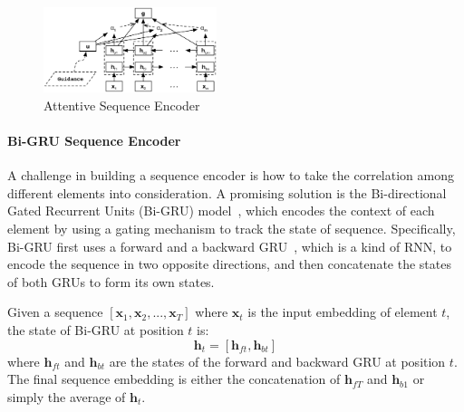 \begin{figure}[htbp]
\vspace{-1em}
\begin{center}
\includegraphics[width=0.45\textwidth]{figures/attentive_seq_encoder.png}	
\caption{Attentive Sequence Encoder}
\label{fig_seq_encoder}
\end{center}
\vspace{-1.5em}
\end{figure}


\paragraph{Bi-GRU Sequence Encoder} 
A challenge in building a sequence encoder is how to take the correlation among different elements into consideration. A promising solution is the Bi-directional Gated Recurrent Units (Bi-GRU) model~\cite{bahdanau2015neural}, which encodes the context of each element by using a gating mechanism to track the state of sequence.
Specifically, Bi-GRU first uses a forward and a backward GRU~\cite{cho2014learning}, which is a kind of RNN, to encode the sequence in two opposite directions, and then concatenate the states of both GRUs to form its own states. 

Given a sequence $[\mathbf{x}_1, \mathbf{x}_2, ..., \mathbf{x}_T]$ where $\mathbf{x}_t$ is the input embedding of element $t$, the state of Bi-GRU at position $t$ is:
%
\begin{equation}
\mathbf{h}_t = [\mathbf{h}_{ft}, \mathbf{h}_{bt}]
\end{equation}
where $\mathbf{h}_{ft}$ and $\mathbf{h}_{bt}$ are the states of the forward and backward GRU at position $t$. %
The final sequence embedding is either the concatenation of $\mathbf{h}_{fT}$ and $\mathbf{h}_{b1}$
or simply the average of $\mathbf{h}_t$.



